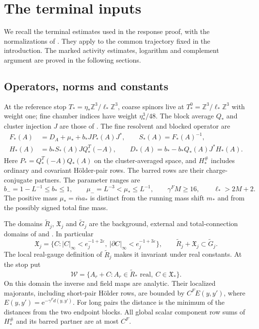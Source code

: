 \documentclass[11pt,letterpaper,reqno]{amsart}
\newcommand{\Z}{\mathbb Z}
\begin{document}
\section{The terminal inputs}\label{sec:rrm-terminal-inputs}

We recall the terminal estimates used in the response proof, with the
normalizations of \cite[\S6 and Appendix~A]{TerminalPressure}.
They apply to the common trajectory fixed in the introduction.
The marked activity estimates, logarithm and complement argument
are proved in the following sections.

\subsection{Operators, norms and constants}
At the reference stop $T_* =\eta_*\Z^3/\ell_*\Z^3$,
coarse spinors live at $T_*^0=\Z^3/\ell_*\Z^3$ with weight one;
fine chamber indices have weight $\eta_*^3/48$.
The block average $Q_*$ and cluster injection $J$ are those of
\cite[\S2.1 and \S4.2]{FermionBlock}. The fine resolvent and blocked operator are
\begin{equation}\label{eq:interacting-terminal-operators}
 \begin{split}
 F_*(A)&=D_A+\mu_*+b_*JP_*(A)J^*,\qquad S_*(A)=F_*(A)^{-1},\\
 H_*(A)&=b_*S_*(A)JQ_*^T(-A),\qquad
 D_*(A)=b_*-b_*Q_*(A)J^*H_*(A).
 \end{split}
\end{equation}
Here $P_*=Q_*^T(-A)Q_*(A)$ on the cluster-averaged space,
and $H_*^\#$ includes ordinary and covariant H\"older-pair rows.
The barred rows are their charge-conjugate partners.
The parameter ranges are
\[
 b_-=1-L^{-1}\le b_*\le1,\qquad
 \mu_-=L^{-3}<\mu_*\le L^{-1},\qquad
 \gamma^FM\ge16,\qquad \ell_*>2M+2.
\]
The positive mass $\mu_*=\bar m a_*$ is distinct from the running
mass shift $m_*$ and from the possibly signed total fine mass.

The domains $\widetilde R_j$, $\mathfrak X_j$ and
$\widetilde G_j$ are the background, external and total-connection
domains of \cite[\S6]{MaxwellBlock} and \cite[\S2.3]{NormalizedContraction}.
In particular
\[
 \mathfrak X_j=\{C:|C|_\infty<e_j^{-1+2\varepsilon},\
                   |\partial C|_\infty<e_j^{-1+3\varepsilon}\},
 \qquad \widetilde R_j+\mathfrak X_j\subset\widetilde G_j.
\]
The local real-gauge definition of $\widetilde R_j$ makes it invariant
under real constants. At the stop put
\[
 \mathcal W=\{A_r+C:A_r\in\widetilde R_*\text{ real},\
                  C\in\mathfrak X_*\}.
\]
On this domain the inverse and field maps are analytic. Their
localized majorants, including short-pair H\"older rows, are bounded
by $C^F E(y,y')$, where $E(y,y')=\mathrm e^{-\gamma^Fd(y,y')}$.
For long pairs the distance is the minimum of the distances from
the two endpoint blocks. All global scalar component row sums of
$H_*^\#$ and its barred partner are at most $C^F$.
\end{document}
